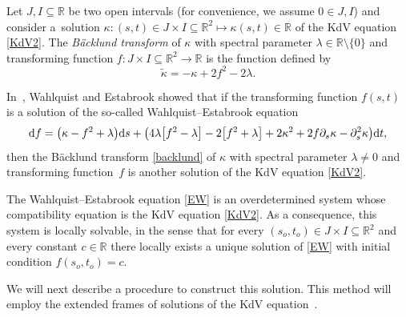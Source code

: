 \documentclass[pdftex]{sigma}
\numberwithin{equation}{section}
\def\bending{\kappa}
\def\R{\mathbb{R}}
\begin{document}
Let $J,I\subseteq\R$ be two open intervals (for convenience, we assume $0\in J,I$) and consider a~solution $\bending\colon (s,t)\in J\times I\subseteq\R^2\longmapsto\bending(s,t)\in\R$ of the KdV equation \eqref{KdV2}. The \emph{B\"{a}cklund transform} of $\bending$ with spectral parameter $\lambda\in\R\setminus\{0\}$ and transforming function $f\colon J\times I\subseteq\R^2\longrightarrow\R$ is the function defined by
\begin{equation}\label{backlund}
	\widetilde{\bending}=-\bending+2f^2-2\lambda.
\end{equation}

In~\cite{WE}, Wahlquist and Estabrook showed that if the transforming function $f(s,t)$ is a solution of the so-called Wahlquist--Estabrook equation
\begin{equation}\label{EW}
	{\rm d}f=\bigl(\bending-f^2+\lambda\bigr){\rm d}s+\bigl(4\lambda\bigl[f^2-\lambda\bigr]-2\bigl[f^2+\lambda\bigr]+2\bending^2+2f\partial_s\bending-\partial_s^2\bending\bigr){\rm d}t,
\end{equation}
then the B\"{a}cklund transform \eqref{backlund} of $\bending$ with spectral parameter $\lambda\neq 0$ and transforming function~$f$ is another solution of the KdV equation \eqref{KdV2}.

The Wahlquist--Estabrook equation \eqref{EW} is an overdetermined system whose compatibility equation is the KdV equation \eqref{KdV2}. As a consequence, this system is locally solvable, in the sense that for every $(s_o,t_o)\in J\times I\subseteq\R^2$ and every constant $c\in\R$ there locally exists a unique solution of \eqref{EW} with initial condition $f(s_o,t_o)=c$.

We will next describe a procedure to construct this solution. This method will employ the extended frames of solutions of the KdV equation~\cite{TU}.
\end{document}
